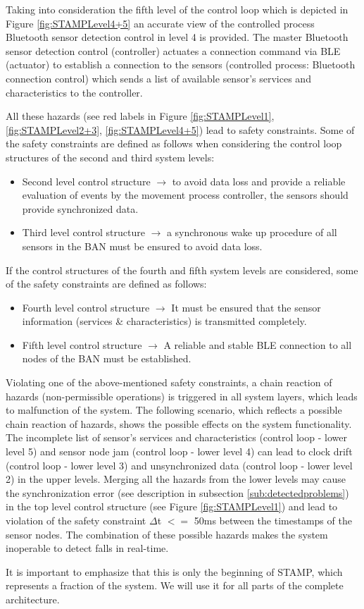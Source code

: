 \documentclass[review]{elsarticle}
\begin{document}
\begin{itemize}
	Taking into consideration the fifth level of the control loop which is depicted in Figure \ref{fig:STAMPLevel4+5} an accurate view of the controlled process Bluetooth sensor detection control in level 4 is provided. The master Bluetooth sensor detection control (controller) actuates a connection command via BLE (actuator) to establish a connection to the sensors (controlled process: Bluetooth connection control) which sends a list of available sensor's services and characteristics to the controller. 
	
	All these hazards (see red labels in Figure \ref{fig:STAMPLevel1}, \ref{fig:STAMPLevel2+3}, \ref{fig:STAMPLevel4+5}) lead to safety constraints.
	Some of the safety constraints are defined as follows when considering the control loop structures of the second and third system levels:
	\begin{itemize}
		\item Second level control structure $\rightarrow$ to avoid data loss and provide a reliable evaluation of events by the movement process controller, the sensors should provide synchronized data.
		\item Third level control structure $\rightarrow$ a synchronous wake up procedure of all sensors in the BAN must be ensured to avoid data loss.
	\end{itemize}
	If the control structures of the fourth and fifth system levels are considered, some of the safety constraints are defined as follows:
	\begin{itemize}
		\item Fourth level control structure $\rightarrow$ It must be ensured that the sensor information (services \& characteristics) is transmitted completely.
		\item Fifth level control structure $\rightarrow$ A reliable and stable BLE connection to all nodes of the BAN must be established.
	\end{itemize}
	Violating one of the above-mentioned safety constraints, a chain reaction of hazards (non-permissible operations) is triggered in all system layers, which leads to malfunction of the system.  The following scenario, which reflects a possible chain reaction of hazards, shows the possible effects on the system functionality.
	The incomplete list of sensor's services and characteristics (control loop - lower level 5) and sensor node jam (control loop - lower level 4) can lead to clock drift (control loop - lower level 3) and unsynchronized data (control loop - lower level 2) in the upper levels. Merging all the hazards from the lower levels may cause the synchronization error (see description in subsection \ref{sub:detectedproblems}) in the top level control structure (see Figure \ref{fig:STAMPLevel1}) and lead to violation of the safety constraint $\Delta$t $<=$ 50ms between the timestamps of the sensor nodes. The combination of these possible hazards makes the system inoperable to detect falls in real-time.
	
\end{itemize}
	It is important to emphasize that this is only the beginning of STAMP, which represents a fraction of the system.  We will use it for all parts of the complete architecture.
\end{document}
